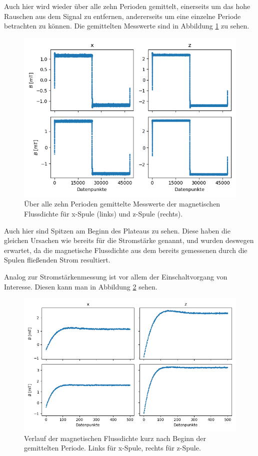 \documentclass[page,pdftex,12pt,a4paper,twoside,openright]{scrbook}
\begin{document}
Auch hier wird wieder über alle zehn Perioden gemittelt, einerseits um das hohe Rauschen aus dem Signal zu entfernen, andererseits um eine einzelne Periode betrachten zu können. Die gemittelten Messwerte sind in Abbildung \ref{fig-mag_avg} zu sehen.

\begin{figure}[H]
\centering
\includegraphics[width=\textwidth]{img/mag_avg.png}
\caption{\label{fig-mag_avg}
Über alle zehn Perioden gemittelte Messwerte der magnetischen Flussdichte für x-Spule (links) und z-Spule (rechts).}
\end{figure}

Auch hier sind Spitzen am Beginn des Plateaus zu sehen. Diese haben die gleichen Ursachen wie bereits für die Stromstärke genannt, und wurden deswegen erwartet, da die magnetische Flussdichte aus dem bereits gemessenen durch die Spulen fließenden Strom resultiert.

Analog zur Stromstärkenmessung ist vor allem der Einschaltvorgang von Interesse. Diesen kann man in Abbildung \ref{fig-mag_anfang} sehen.

\begin{figure}[H]
\centering
\includegraphics[width=\textwidth]{img/mag_anfang.png}
\caption{\label{fig-mag_anfang}
Verlauf der magnetischen Flussdichte kurz nach Beginn der gemittelten Periode. Links für x-Spule, rechts für z-Spule.}
\end{figure}
\end{document}
